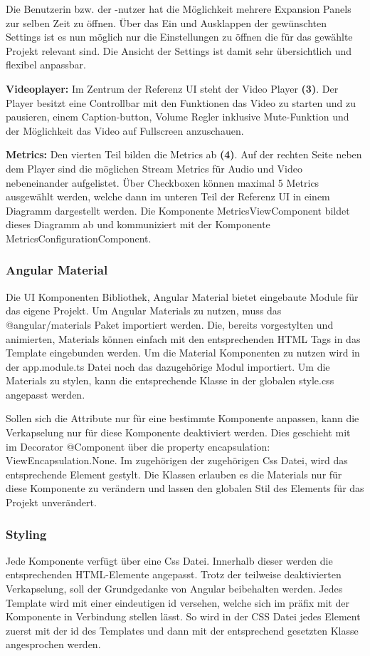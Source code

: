\documentclass[conference]{IEEEtran}
\begin{document}
Die Benutzerin bzw. der -nutzer	hat die Möglichkeit mehrere Expansion Panels zur selben Zeit zu öffnen. Über das Ein und Ausklappen der gewünschten Settings ist es nun möglich nur die Einstellungen zu öffnen die für das gewählte Projekt relevant sind. Die Ansicht der Settings ist damit sehr übersichtlich und flexibel anpassbar.

\textbf{Videoplayer:}
Im Zentrum der Referenz UI steht der Video Player \textbf{(3)}. Der Player besitzt eine Controllbar mit den Funktionen das Video zu starten und zu pausieren, einem Caption-button, Volume Regler inklusive Mute-Funktion und der Möglichkeit das Video auf Fullscreen anzuschauen.

\textbf{Metrics:}
Den vierten Teil bilden die Metrics ab \textbf{(4)}. Auf der rechten Seite neben dem Player sind die möglichen Stream Metrics für Audio und Video nebeneinander aufgelistet. Über Checkboxen können maximal 5 Metrics ausgewählt werden, welche dann im unteren Teil der Referenz UI in einem Diagramm dargestellt werden. Die Komponente MetricsViewComponent bildet dieses Diagramm ab und kommuniziert mit der Komponente MetricsConfigurationComponent.

\subsubsection{Angular Material}
Die UI Komponenten Bibliothek, Angular Material bietet eingebaute Module für das eigene Projekt. Um Angular Materials zu nutzen, muss das @angular/materials Paket importiert werden. Die, bereits vorgestylten und animierten, Materials können einfach mit den entsprechenden HTML Tags in das Template eingebunden werden. Um die Material Komponenten zu nutzen wird in der app.module.ts Datei noch das dazugehörige Modul importiert.  Um die Materials zu stylen, kann die entsprechende Klasse in der globalen style.css angepasst werden. 

Sollen sich die Attribute nur für eine bestimmte Komponente anpassen, kann die Verkapselung nur für diese Komponente deaktiviert werden. Dies geschieht mit im Decorator @Component über die property encapsulation: ViewEncapsulation.None.
Im zugehörigen der zugehörigen Css Datei, wird das entsprechende Element gestylt.
Die Klassen erlauben es die Materials nur für diese Komponente zu verändern und lassen den globalen Stil des Elements für das Projekt unverändert.

\subsubsection{Styling}
Jede Komponente verfügt über eine Css Datei. Innerhalb dieser werden die entsprechenden HTML-Elemente angepasst. Trotz der teilweise deaktivierten Verkapselung, soll der Grundgedanke von Angular beibehalten werden. Jedes Template wird mit einer eindeutigen id versehen, welche sich im präfix mit der Komponente in Verbindung stellen lässt. So wird in der CSS Datei jedes Element zuerst mit der id des Templates und dann mit der entsprechend gesetzten Klasse angesprochen werden.
\end{document}
